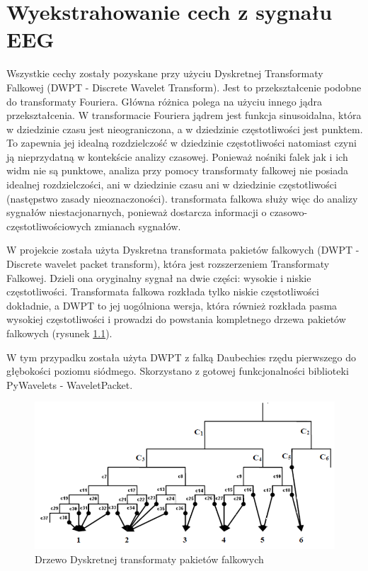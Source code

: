\documentclass[12pt, notitlepage]{report}
\begin{document}
    \chapter{Wyekstrahowanie cech z sygnału EEG}
        Wszystkie cechy zostały pozyskane przy użyciu Dyskretnej Transformaty Falkowej (DWPT - Discrete Wavelet Transform). Jest to przekształcenie podobne do transformaty Fouriera. Główna różnica polega na użyciu innego jądra przekształcenia. W transformacie Fouriera jądrem jest funkcja sinusoidalna, która w dziedzinie czasu jest nieograniczona, a w dziedzinie częstotliwości jest punktem. To zapewnia jej idealną rozdzielczość w dziedzinie częstotliwości natomiast czyni ją nieprzydatną w kontekście analizy czasowej. Ponieważ nośniki falek jak i ich widm nie są punktowe, analiza przy pomocy transformaty falkowej nie posiada idealnej rozdzielczości, ani w dziedzinie czasu ani w dziedzinie częstotliwości (następstwo zasady nieoznaczoności). transformata falkowa służy więc do analizy sygnałów niestacjonarnych, ponieważ dostarcza informacji o czasowo-częstotliwościowych zmianach sygnałów.

        W projekcie została użyta Dyskretna transformata pakietów falkowych (DWPT - Discrete wavelet packet transform), która jest rozszerzeniem Transformaty Falkowej. Dzieli ona oryginalny sygnał na dwie części: wysokie i niskie częstotliwości. Transformata falkowa rozkłada tylko niskie częstotliwości dokładnie, a DWPT to jej uogólniona wersja, która również rozkłada pasma wysokiej częstotliwości i prowadzi do powstania kompletnego drzewa pakietów falkowych (rysunek \ref{fig:tree}).

        W tym przypadku została użyta DWPT z falką Daubechies rzędu pierwszego do głębokości poziomu siódmego. Skorzystano z gotowej funkcjonalności biblioteki PyWavelets - WaveletPacket. 
            
        \begin{figure}[h!]
            \centering
            \includegraphics[width=\textwidth]{tree}
            \caption{Drzewo Dyskretnej transformaty pakietów falkowych}
            \label{fig:tree}
        \end{figure}
            
\end{document}
